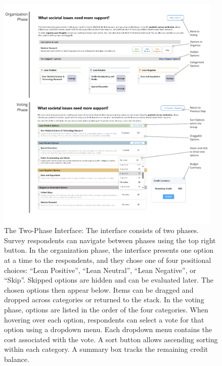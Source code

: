 \begin{figure}[ht]
    \centering
    \includegraphics[width=0.96\textwidth]{content/image/detailed.pdf}
    \caption{The Two-Phase Interface: The interface consists of two phases. Survey respondents can navigate between phases using the top right button. In the organization phase, the interface presents one option at a time to the respondents, and they chose one of four positional choices: ``Lean Positive'', ``Lean Neutral'', ``Lean Negative'', or ``Skip''. Skipped options are hidden and can be evaluated later. The chosen options then appear below. Items can be dragged and dropped across categories or returned to the stack. In the voting phase, options are listed in the order of the four categories. When hovering over each option, respondents can select a vote for that option using a dropdown menu. Each dropdown menu contains the cost associated with the vote. A sort button allows ascending sorting within each category. A summary box tracks the remaining credit balance.}
    \label{fig:interactiveInterface}
    \Description{
}
\end{figure}
